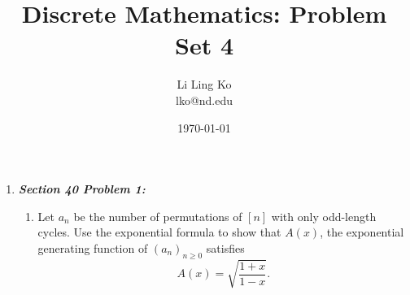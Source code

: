 \documentclass{article}
\begin{document}
\title{Discrete Mathematics: Problem Set 4}
\author{Li Ling Ko\\ lko@nd.edu}
\date{\today}
\maketitle

\begin{enumerate}[label={\bf Q\arabic*:}]
  \item \it \textbf{Section 40 Problem 1:}
    \begin{enumerate}
      \item Let $a_n$ be the number of permutations of $[n]$ with only
        odd-length cycles. Use the exponential formula to show that $A(x)$,
        the exponential generating function of $(a_n)_{n\geq0}$ satisfies
        \[A(x) = \sqrt{\frac{1+x}{1-x}}.\]
    \end{enumerate}
\end{enumerate}
\end{document}
